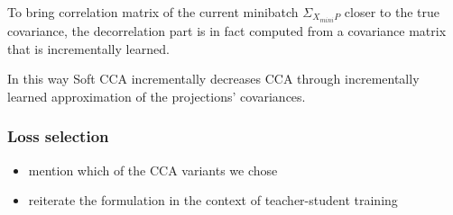 To bring correlation matrix of the current minibatch $\Sigma_{X_{mini}P}$
closer to the true covariance, the decorrelation part is in fact computed from
a covariance matrix that is incrementally learned.

In this way Soft CCA incrementally decreases CCA through incrementally learned
approximation of the projections' covariances.

\subsubsection{Loss selection}

\begin{itemize}
    \item mention which of the CCA variants we chose
    \item reiterate the formulation in the context of teacher-student training
\end{itemize}
